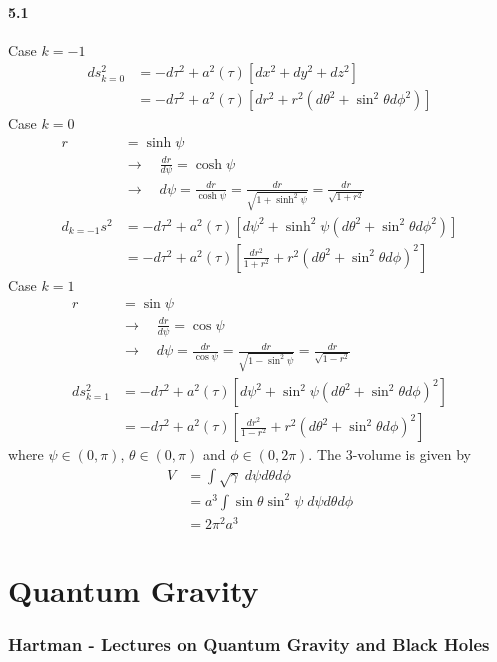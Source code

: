 \documentclass[10pt,a4paper]{book}
\theoremstyle{definition}
\begin{document}
\subsubsection{5.1}
Case $k=-1$
\begin{align}
ds_{k=0}^2&=-d\tau^2+a^2(\tau)\left[dx^2+dy^2+dz^2\right]\\
 &=-d\tau^2+a^2(\tau)\left[dr^2+r^2(d\theta^2+\sin^2\theta d\phi^2)\right]
\end{align}
Case $k=0$
\begin{align}
r&=\sinh\psi\\
&\rightarrow\quad\frac{dr}{d\psi}=\cosh\psi\\
&\rightarrow\quad d\psi=\frac{dr}{\cosh\psi}=\frac{dr}{\sqrt{1+\sinh^2\psi}}=\frac{dr}{\sqrt{1+r^2}}\\
d_{k=-1}s^2&=-d\tau^2+a^2(\tau)\left[d\psi^2+\sinh^2\psi(d\theta^2+\sin^2\theta d\phi^2)\right]\\
&=-d\tau^2+a^2(\tau)\left[\frac{dr^2}{1+r^2}+r^2(d\theta^2+\sin^2\theta d\phi)^2\right]
\end{align}
Case $k=1$
\begin{align}
r&=\sin\psi\\
&\rightarrow\quad\frac{dr}{d\psi}=\cos\psi\\
&\rightarrow\quad d\psi=\frac{dr}{\cos\psi}=\frac{dr}{\sqrt{1-\sin^2\psi}}=\frac{dr}{\sqrt{1-r^2}}\\
ds_{k=1}^2&=-d\tau^2+a^2(\tau)\left[d\psi^2+\sin^2\psi(d\theta^2+\sin^2\theta d\phi)^2\right]\\
&=-d\tau^2+a^2(\tau)\left[\frac{dr^2}{1-r^2}+r^2(d\theta^2+\sin^2\theta d\phi)^2\right]
\end{align}
where $\psi\in(0,\pi)$, $\theta\in(0,\pi)$ and $\phi\in(0,2\pi)$. The 3-volume is given by
\begin{align}
V&=\int \sqrt{\gamma}\;d\psi d\theta d\phi\\
&=a^3\int \sin\theta\sin^2\psi\; d\psi d\theta d\phi\\
&=2\pi^2 a^3
\end{align}


\newpage
\chapter{Quantum Gravity}
\subsection{{\sc Hartman} - Lectures on Quantum Gravity and Black Holes}
\end{document}
